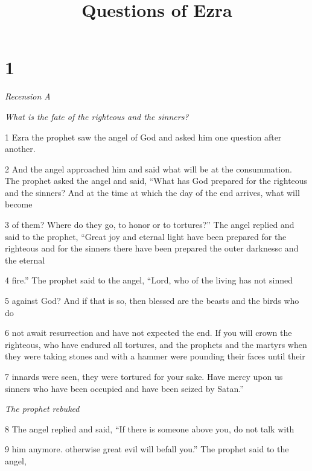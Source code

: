 

\title{Questions of Ezra}

\chapter{1}

\par \textit{Recension A}

\par \textit{What is the fate of the righteous and the sinners?}

\par 1 Ezra the prophet saw the angel of God and asked him one question after another.

\par 2 And the angel approached him and said what will be at the consummation. The prophet asked the angel and said, “What has God prepared for the righteous and the sinners? And at the time at which the day of the end arrives, what will become

\par 3 of them? Where do they go, to honor or to tortures?” The angel replied and said to the prophet, “Great joy and eternal light have been prepared for the righteous and for the sinners there have been prepared the outer darknessc and the eternal

\par 4 fire.” The prophet said to the angel, “Lord, who of the living has not sinned

\par 5 against God? And if that is so, then blessed are the beasts and the birds who do

\par 6 not await resurrection and have not expected the end. If you will crown the righteous, who have endured all tortures, and the prophets and the martyrs when they were taking stones and with a hammer were pounding their faces until their

\par 7 innards were seen, they were tortured for your sake. Have mercy upon us sinners who have been occupied and have been seized by Satan.”

\par \textit{The prophet rebuked}

\par 8 The angel replied and said, “If there is someone above you, do not talk with

\par 9 him anymore. otherwise great evil will befall you.” The prophet said to the angel,

